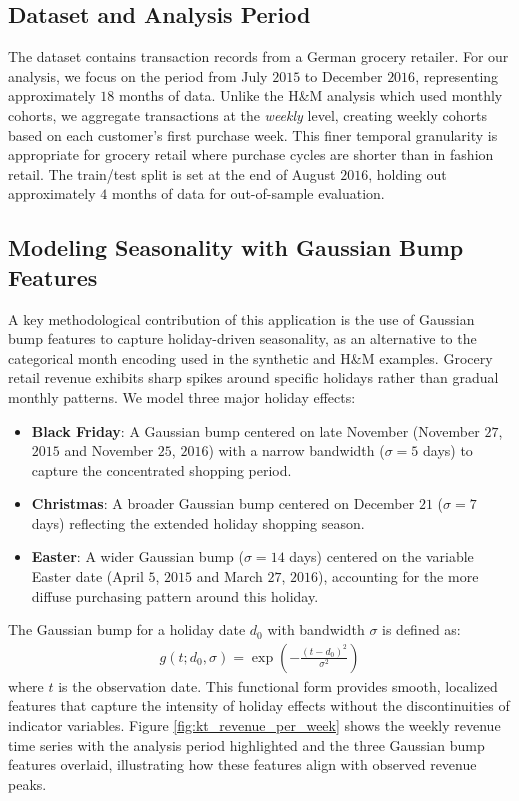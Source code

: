 \documentclass[11pt]{amsart}
\theoremstyle{definition}
\begin{document}
\subsection{Dataset and Analysis Period}

The dataset contains transaction records from a German grocery retailer. For our analysis, we focus on the period
from July $2015$ to December $2016$, representing approximately $18$ months of data. Unlike the H\&M analysis
which used monthly cohorts, we aggregate transactions at the \emph{weekly} level, creating weekly cohorts based
on each customer's first purchase week. This finer temporal granularity is appropriate for grocery retail where
purchase cycles are shorter than in fashion retail. The train/test split is set at the end of August $2016$,
holding out approximately $4$ months of data for out-of-sample evaluation.

\subsection{Modeling Seasonality with Gaussian Bump Features}

A key methodological contribution of this application is the use of Gaussian bump features to capture holiday-driven
seasonality, as an alternative to the categorical month encoding used in the synthetic and H\&M examples. Grocery
retail revenue exhibits sharp spikes around specific holidays rather than gradual monthly patterns. We model three
major holiday effects:

\begin{itemize}
    \item \textbf{Black Friday}: A Gaussian bump centered on late November (November $27$, $2015$ and November $25$, $2016$)
          with a narrow bandwidth ($\sigma = 5$ days) to capture the concentrated shopping period.
    \item \textbf{Christmas}: A broader Gaussian bump centered on December $21$ ($\sigma = 7$ days) reflecting the
          extended holiday shopping season.
    \item \textbf{Easter}: A wider Gaussian bump ($\sigma = 14$ days) centered on the variable Easter date
          (April $5$, $2015$ and March $27$, $2016$), accounting for the more diffuse purchasing pattern around this holiday.
\end{itemize}

The Gaussian bump for a holiday date $d_0$ with bandwidth $\sigma$ is defined as:
\begin{align*}
    g(t; d_0, \sigma) = \exp\left(-\frac{(t - d_0)^2}{\sigma^2}\right)
\end{align*}
where $t$ is the observation date. This functional form provides smooth, localized features that capture the
intensity of holiday effects without the discontinuities of indicator variables. Figure \ref{fig:kt_revenue_per_week}
shows the weekly revenue time series with the analysis period highlighted and the three Gaussian bump features overlaid,
illustrating how these features align with observed revenue peaks.
\end{document}
